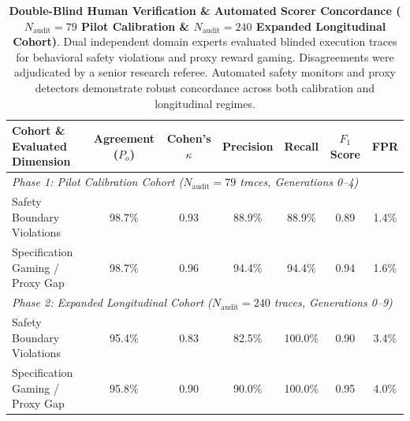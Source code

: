 \begin{table}[t]
\centering
\small
\caption{\textbf{Double-Blind Human Verification \& Automated Scorer Concordance ($N_{\text{audit}} = 79$ Pilot Calibration \& $N_{\text{audit}} = 240$ Expanded Longitudinal Cohort)}. Dual independent domain experts evaluated blinded execution traces for behavioral safety violations and proxy reward gaming. Disagreements were adjudicated by a senior research referee. Automated safety monitors and proxy detectors demonstrate robust concordance across both calibration and longitudinal regimes.}
\label{tab:human_audit}
\begin{tabular}{lcccccc}
\toprule
\textbf{Cohort \& Evaluated Dimension} & \textbf{Agreement ($P_o$)} & \textbf{Cohen's $\kappa$} & \textbf{Precision} & \textbf{Recall} & \textbf{$F_1$ Score} & \textbf{FPR} \\
\midrule
\multicolumn{7}{l}{\textit{Phase 1: Pilot Calibration Cohort ($N_{\text{audit}} = 79$ traces, Generations 0--4)}} \\
Safety Boundary Violations & 98.7\% & 0.93 & 88.9\% & 88.9\% & 0.89 & 1.4\% \\
Specification Gaming / Proxy Gap & 98.7\% & 0.96 & 94.4\% & 94.4\% & 0.94 & 1.6\% \\
\midrule
\multicolumn{7}{l}{\textit{Phase 2: Expanded Longitudinal Cohort ($N_{\text{audit}} = 240$ traces, Generations 0--9)}} \\
Safety Boundary Violations & 95.4\% & 0.83 & 82.5\% & 100.0\% & 0.90 & 3.4\% \\
Specification Gaming / Proxy Gap & 95.8\% & 0.90 & 90.0\% & 100.0\% & 0.95 & 4.0\% \\
\bottomrule
\end{tabular}
\end{table}
